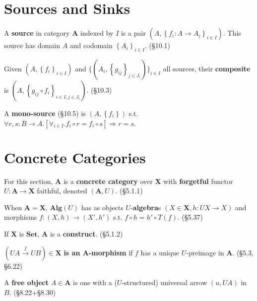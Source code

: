 \documentclass[10pt,twocolumn,letterpaper]{article}
\newcommand{\brak}[1]{\left[{#1}\right]}
\newcommand{\set}[1]{\left\{{#1}\right\}}
\newcommand{\defn}[1]{{\bf #1}}
\begin{document}
\section{Sources and Sinks}

  A \defn{source} in category $\mathbf{A}$ indexed by $I$ is a pair $(A,
  \set{f_i : A \to A_i}_{i \in I})$.  This source has domain $A$ and
  codomain $\set{A_i}_{i\in I}$. (\S10.1)

  Given $(A,\set{f_i}_{i \in I})$ and
  $\{(A_i,\set{g_{ij}}_{j \in J_i})\}_{i \in I}$
  all sources, their \defn{composite} is $(A, \set{g_{ij} \circ f_i}_{i\in I,
  j\in J_i})$. (\S10.3)

  A \defn{mono-source} (\S10.5) is $(A,\set{f_i})$ s.t. \\ $\forall r,s: B \to A.
  \brak{\forall_{i\in I} . f_i \circ r = f_i \circ s} \Rightarrow r = s$.

\section{Concrete Categories}

  For this section, $\mathbf{A}$ is a \defn{concrete category} over
  $\mathbf{X}$ with \defn{forgetful} functor $U : \mathbf{A} \to \mathbf{X}$
  faithful, denoted $(\mathbf{A}, U)$.  (\S5.1.1)

  When $\mathbf{A} = \mathbf{X}$, $\mathbf{Alg}(U)$ has as objects
  $U$-\defn{algebra}s $(X \in \mathbf{X}, h : UX \to X)$ and morphisms
  $f : (X,h) \to (X',h')$ s.t. $f \circ h = h' \circ T(f)$. (\S5.37)

  If $\mathbf{X}$ is $\mathbf{Set}$, $\mathbf{A}$ is a \defn{construct}.
  (\S5.1.2)

  $(UA \overset{f}{\to} UB) \in \mathbf{X}$ \defn{is an $\mathbf{A}$-morphism}
  if $f$ has a unique $U$-preimage in $\mathbf{A}$. (\S5.3, \S6.22)


  A \defn{free object} $A \in \mathbf{A}$ is one with a ($U$-structured)
  universal arrow $(u,UA)$ in $B$. (\S8.22+\S8.30)

\end{document}
